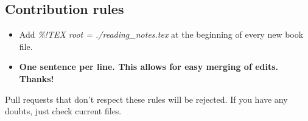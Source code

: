 \subsection{Contribution rules}
\begin{itemize}
    \item Add \textit{\%!TEX root = ./reading\_notes.tex} at the beginning of every new book file.
    \item \textbf{One sentence per line. This allows for easy merging of edits. Thanks!} 
\end{itemize}

Pull requests that don't respect these rules will be rejected. If you have any doubts, just check current files.